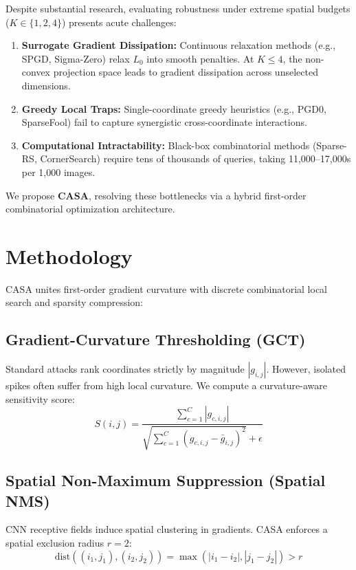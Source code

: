 \documentclass[10pt,twocolumn,letterpaper]{article}
\begin{document}
Despite substantial research, evaluating robustness under extreme spatial budgets ($K \in \{1, 2, 4\}$) presents acute challenges:
\begin{enumerate}
    \item \textbf{Surrogate Gradient Dissipation:} Continuous relaxation methods (e.g., SPGD, Sigma-Zero) relax $L_0$ into smooth penalties. At $K \le 4$, the non-convex projection space leads to gradient dissipation across unselected dimensions.
    \item \textbf{Greedy Local Traps:} Single-coordinate greedy heuristics (e.g., PGD0, SparseFool) fail to capture synergistic cross-coordinate interactions.
    \item \textbf{Computational Intractability:} Black-box combinatorial methods (Sparse-RS, CornerSearch) require tens of thousands of queries, taking 11,000--17,000s per 1,000 images.
\end{enumerate}
We propose \textbf{CASA}, resolving these bottlenecks via a hybrid first-order combinatorial optimization architecture.

\section{Methodology}
CASA unites first-order gradient curvature with discrete combinatorial local search and sparsity compression:
\subsection{Gradient-Curvature Thresholding (GCT)}
Standard attacks rank coordinates strictly by magnitude $|g_{i,j}|$. However, isolated spikes often suffer from high local curvature. We compute a curvature-aware sensitivity score:
\begin{equation}
S(i, j) = \frac{\sum_{c=1}^C |g_{c, i, j}|}{\sqrt{\sum_{c=1}^C (g_{c, i, j} - \bar{g}_{i, j})^2} + \epsilon}
\end{equation}

\subsection{Spatial Non-Maximum Suppression (Spatial NMS)}
CNN receptive fields induce spatial clustering in gradients. CASA enforces a spatial exclusion radius $r=2$:
\begin{equation}
\text{dist}((i_1, j_1), (i_2, j_2)) = \max(|i_1 - i_2|, |j_1 - j_2|) > r
\end{equation}
\end{document}
